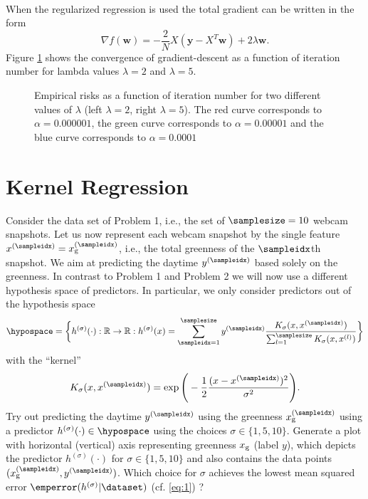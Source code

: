 \documentclass[article,11pt]{article}
\begin{document}
\\
When the regularized regression is used the total gradient can be written in the
form
\begin{equation}
  \nabla f(\mathbf{w})=-\frac{2}{N}X(\mathbf{y}-X^T\mathbf{w}) +2\lambda\mathbf{w}.
  \label{eq:totalgradientregularized}
\end{equation}
Figure \ref{fig:regularizedgradient} shows the convergence of gradient-descent
as a function of iteration number for lambda values $\lambda=2$ and $\lambda=5$.
\begin{figure}[!h]
  \centering
  \caption{Empirical risks as a function of iteration number for two different
      values of $\lambda$ (left $\lambda=2$, right $\lambda=5$). The red curve
      corresponds to $\alpha=0.000001$, the green curve corresponds to
      $\alpha=0.00001$ and the blue curve corresponds to $\alpha=0.0001$}
  \label{fig:regularizedgradient}
\end{figure}

\newpage
\section{Kernel Regression}
Consider the data set of Problem 1, i.e., the set of $\samplesize=10$ webcam snapshots. Let us now represent each webcam snapshot by 
the single feature $x^{(\sampleidx)} = x_{\rm g}^{(\sampleidx)}$, i.e., the total greenness of the $\sampleidx$th snapshot. We aim 
at predicting the daytime $y^{(\sampleidx)}$ based solely on the greenness. In contrast to Problem 1 and Problem 2 we will now 
use a different hypothesis space of predictors. In particular, we only consider predictors out of the hypothesis space
\begin{equation}
\hypospace = \bigg\{h^{(\sigma)}(\cdot): \mathbb{R} \rightarrow \mathbb{R}: h^{(\sigma)} (x) = \sum_{\sampleidx=1}^{\samplesize} y^{(\sampleidx)} \frac{K_\sigma(x,x^{(\sampleidx)})}{\sum_{l=1}^{\samplesize} K_\sigma (x,x^{(l)})} \bigg\}
\end{equation}
with the ``kernel''  
\begin{equation}
K_\sigma(x, x^{(\sampleidx)}) = \exp \Bigg( -\frac{1}{2} \frac{(x-x^{(\sampleidx)})^2 }{\sigma^2} \Bigg).
\end{equation}
Try out predicting the daytime $y^{(\sampleidx)}$ using the greenness $x_{\rm g}^{(\sampleidx)}$ using a predictor $h^{(\sigma)}(\cdot) \in \hypospace$ using the 
choices $\sigma \in \{1,5,10\}$. Generate a plot with horizontal (vertical) axis representing greenness $x_{\rm g}$ (label $y$), which depicts the predictor 
$h^{(\sigma)}(\cdot)$ for $\sigma \in \{1,5,10\}$ and also contains the data points $(x_{\rm g}^{(\sampleidx)},y^{(\sampleidx)})$.
Which choice for $\sigma$ achieves the lowest mean squared error $\emperror(h^{(\sigma)}| \dataset)$ (cf. \eqref{eq:1}) ?
\end{document}
